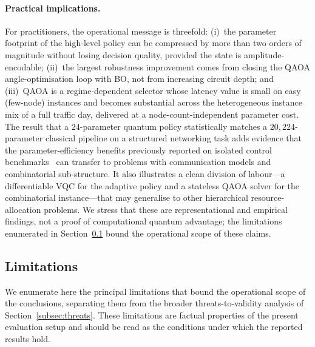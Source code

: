 \documentclass[11pt,a4paper]{article}
\theoremstyle{definition}
\begin{document}
\paragraph{Practical implications.}
For practitioners, the operational message is threefold: (i)~the parameter footprint of the high-level policy can be compressed by more than two orders of magnitude without losing decision quality, provided the state is amplitude-encodable; (ii)~the largest robustness improvement comes from closing the QAOA angle-optimisation loop with BO, not from increasing circuit depth; and (iii)~QAOA is a regime-dependent selector whose latency value is small on easy (few-node) instances and becomes substantial across the heterogeneous instance mix of a full traffic day, delivered at a node-count-independent parameter cost. The result that a $24$-parameter quantum policy statistically matches a $20{,}224$-parameter classical pipeline on a structured networking task adds evidence that the parameter-efficiency benefits previously reported on isolated control benchmarks~\cite{vqc_drl,sequeira2023policygradient} can transfer to problems with communication models and combinatorial sub-structure. It also illustrates a clean division of labour---a differentiable VQC for the adaptive policy and a stateless QAOA solver for the combinatorial instance---that may generalise to other hierarchical resource-allocation problems. We stress that these are representational and empirical findings, not a proof of computational quantum advantage; the limitations enumerated in Section~\ref{subsec:limitations} bound the operational scope of these claims.

\subsection{Limitations}
\label{subsec:limitations}

We enumerate here the principal limitations that bound the operational scope of the conclusions, separating them from the broader threats-to-validity analysis of Section~\ref{subsec:threats}. These limitations are factual properties of the present evaluation setup and should be read as the conditions under which the reported results hold.
\end{document}

